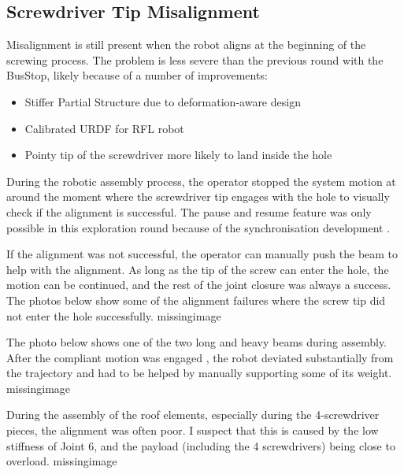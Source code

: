 \subsection{Screwdriver Tip Misalignment}
\label{subsection:exploration-4-screwdriver-tip-misalignment}

Misalignment is still present when the robot aligns at the beginning of the screwing process. The problem is less severe than the previous round with the BusStop, likely because of a number of improvements:
\begin{itemize}
    \item Stiffer Partial Structure due to deformation-aware design 
    \item Calibrated URDF for RFL robot 
    \item Pointy tip of the screwdriver more likely to land inside the hole
\end{itemize}

During the robotic assembly process, the operator stopped the system motion at around the moment where the screwdriver tip engages with the hole to visually check if the alignment is successful. The pause and resume feature was only possible in this exploration round because of the synchronisation development .

If the alignment was not successful, the operator can manually push the beam to help with the alignment. As long as the tip of the screw can enter the hole, the motion can be continued, and the rest of the joint closure was always a success. The photos below show some of the alignment failures where the screw tip did not enter the hole successfully. 
missingimage

The photo below shows one of the two long and heavy beams during assembly. After the compliant motion was engaged , the robot deviated substantially from the trajectory and had to be helped by manually supporting some of its weight.
missingimage

During the assembly of the roof elements, especially during the 4-screwdriver pieces, the alignment was often poor. I suspect that this is caused by the low stiffness of Joint 6, and the payload (including the 4 screwdrivers) being close to overload. 
missingimage

